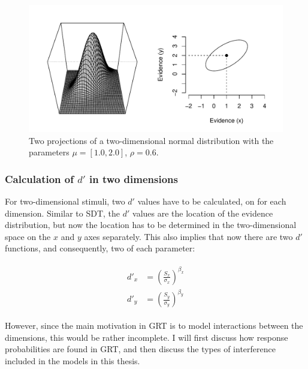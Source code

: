 \documentclass{article}\usepackage{knitr}
\begin{document}
\begin{figure}
\centering
\begin{knitrout}
\color{fgcolor}
\includegraphics[width=\maxwidth]{figure/unnamed-chunk-7-1} 

\end{knitrout}
\caption{Two projections of a two-dimensional normal distribution with the parameters $\mu = [1.0, 2.0]$, $\rho = 0.6$.} 
\label{fig:2dimnorm}
\end{figure}

\subsubsection{Calculation of $d'$ in two dimensions}

For two-dimensional stimuli, two $d'$ values have to be calculated, on for each dimension. Similar to SDT, the $d'$ values are the location of the evidence distribution, but now the location has to be determined in the two-dimensional space on the $x$ and $y$ axes separately. This also implies that now there are two $d'$ functions, and consequently, two of each parameter: 

\begin{align}
\label{eq:twodimdprime}
\begin{split}
d'_x &= (\frac{S_x}{\sigma_x})^{\beta_x}\\
d'_y &= (\frac{S_y}{\sigma_y})^{\beta_y}
\end{split}
\end{align}

However, since the main motivation in GRT is to model interactions between the dimensions, this would be rather incomplete. I will first discuss how response probabilities are found in GRT, and then discuss the types of interference included in the models in this thesis.
\end{document}
